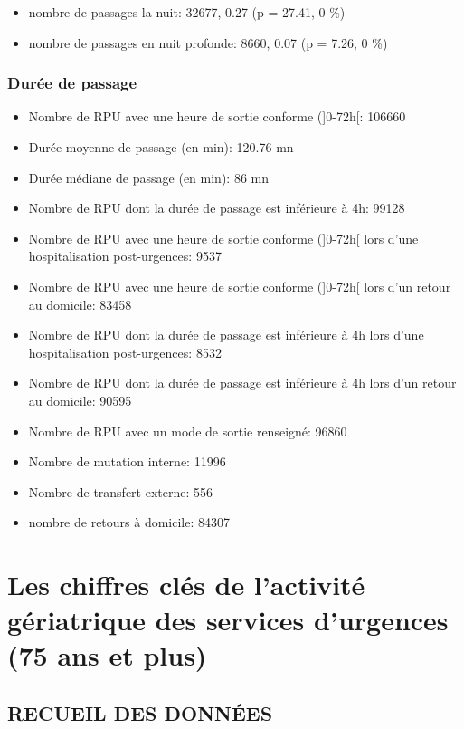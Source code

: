\documentclass[]{article}
\begin{document}
\begin{itemize}
\itemsep1pt\parskip0pt
\item
  nombre de passages la nuit: 32677, 0.27 (p = 27.41, 0 \%)
\item
  nombre de passages en nuit profonde: 8660, 0.07 (p = 7.26, 0 \%)
\end{itemize}

\subsubsection{Durée de passage}\label{duree-de-passage}

\begin{itemize}
\item
  Nombre de RPU avec une heure de sortie conforme ({]}0-72h{[}: 106660
\item
  Durée moyenne de passage (en min): 120.76 mn
\item
  Durée médiane de passage (en min): 86 mn
\item
  Nombre de RPU dont la durée de passage est inférieure à 4h: 99128
\item
  Nombre de RPU avec une heure de sortie conforme ({]}0-72h{[} lors
  d'une hospitalisation post-urgences: 9537
\item
  Nombre de RPU avec une heure de sortie conforme ({]}0-72h{[} lors d'un
  retour au domicile: 83458
\item
  Nombre de RPU dont la durée de passage est inférieure à 4h lors d'une
  hospitalisation post-urgences: 8532
\item
  Nombre de RPU dont la durée de passage est inférieure à 4h lors d'un
  retour au domicile: 90595
\item
  Nombre de RPU avec un mode de sortie renseigné: 96860
\item
  Nombre de mutation interne: 11996
\item
  Nombre de transfert externe: 556
\item
  nombre de retours à domicile: 84307
\end{itemize}

\section{Les chiffres clés de l'activité gériatrique des services
d'urgences (75 ans et
plus)}\label{les-chiffres-cles-de-lactivite-geriatrique-des-services-durgences-75-ans-et-plus}

\subsection{RECUEIL DES DONNÉES}\label{recueil-des-donnees-2}
\end{document}
